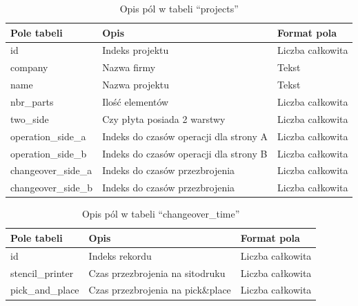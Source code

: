 \begin{table}[H]
	\centering
	\caption{Opis pól w tabeli ``projects''}
	\begin{tabular}{lll}
		\toprule
		Pole tabeli         & Opis                                    & Format pola       \\
		\midrule
		id                  & Indeks projektu                         & Liczba całkowita \\
		company             & Nazwa firmy                             & Tekst             \\
		name                & Nazwa projektu                          & Tekst             \\
		nbr\_parts          & Ilość elementów                      & Liczba całkowita \\
		two\_side           & Czy płyta posiada 2 warstwy            & Liczba całkowita \\
		operation\_side\_a  & Indeks do czasów operacji dla strony A & Liczba całkowita \\
		operation\_side\_b  & Indeks do czasów operacji dla strony B & Liczba całkowita \\
		changeover\_side\_a & Indeks do czasów przezbrojenia         & Liczba całkowita \\
		changeover\_side\_b & Indeks do czasów przezbrojenia         & Liczba całkowita \\
		\bottomrule
	\end{tabular}
\end{table}

\begin{table}[H]
	\centering
	\caption{Opis pól w tabeli ``changeover\_time''}
	\begin{tabular}{lll}
		\toprule
		Pole tabeli      & Opis                              & Format pola       \\
		\midrule
		id               & Indeks rekordu                    & Liczba całkowita \\
		stencil\_printer & Czas przezbrojenia na sitodruku   & Liczba całkowita \\
		pick\_and\_place & Czas przezbrojenia na pick\&place & Liczba całkowita \\
		\bottomrule
	\end{tabular}
\end{table}

